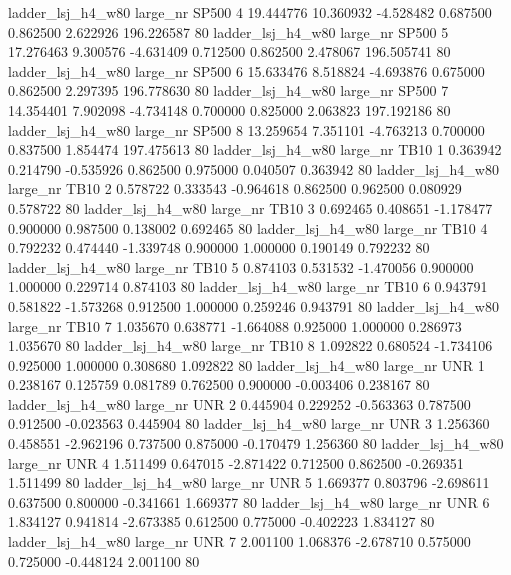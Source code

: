   ladder_lsj_h4_w80   large_nr    SP500                 4 19.444776 10.360932  -4.528482 0.687500 0.862500  2.622926  196.226587 80
  ladder_lsj_h4_w80   large_nr    SP500                 5 17.276463  9.300576  -4.631409 0.712500 0.862500  2.478067  196.505741 80
  ladder_lsj_h4_w80   large_nr    SP500                 6 15.633476  8.518824  -4.693876 0.675000 0.862500  2.297395  196.778630 80
  ladder_lsj_h4_w80   large_nr    SP500                 7 14.354401  7.902098  -4.734148 0.700000 0.825000  2.063823  197.192186 80
  ladder_lsj_h4_w80   large_nr    SP500                 8 13.259654  7.351101  -4.763213 0.700000 0.837500  1.854474  197.475613 80
  ladder_lsj_h4_w80   large_nr     TB10                 1  0.363942  0.214790  -0.535926 0.862500 0.975000  0.040507    0.363942 80
  ladder_lsj_h4_w80   large_nr     TB10                 2  0.578722  0.333543  -0.964618 0.862500 0.962500  0.080929    0.578722 80
  ladder_lsj_h4_w80   large_nr     TB10                 3  0.692465  0.408651  -1.178477 0.900000 0.987500  0.138002    0.692465 80
  ladder_lsj_h4_w80   large_nr     TB10                 4  0.792232  0.474440  -1.339748 0.900000 1.000000  0.190149    0.792232 80
  ladder_lsj_h4_w80   large_nr     TB10                 5  0.874103  0.531532  -1.470056 0.900000 1.000000  0.229714    0.874103 80
  ladder_lsj_h4_w80   large_nr     TB10                 6  0.943791  0.581822  -1.573268 0.912500 1.000000  0.259246    0.943791 80
  ladder_lsj_h4_w80   large_nr     TB10                 7  1.035670  0.638771  -1.664088 0.925000 1.000000  0.286973    1.035670 80
  ladder_lsj_h4_w80   large_nr     TB10                 8  1.092822  0.680524  -1.734106 0.925000 1.000000  0.308680    1.092822 80
  ladder_lsj_h4_w80   large_nr      UNR                 1  0.238167  0.125759   0.081789 0.762500 0.900000 -0.003406    0.238167 80
  ladder_lsj_h4_w80   large_nr      UNR                 2  0.445904  0.229252  -0.563363 0.787500 0.912500 -0.023563    0.445904 80
  ladder_lsj_h4_w80   large_nr      UNR                 3  1.256360  0.458551  -2.962196 0.737500 0.875000 -0.170479    1.256360 80
  ladder_lsj_h4_w80   large_nr      UNR                 4  1.511499  0.647015  -2.871422 0.712500 0.862500 -0.269351    1.511499 80
  ladder_lsj_h4_w80   large_nr      UNR                 5  1.669377  0.803796  -2.698611 0.637500 0.800000 -0.341661    1.669377 80
  ladder_lsj_h4_w80   large_nr      UNR                 6  1.834127  0.941814  -2.673385 0.612500 0.775000 -0.402223    1.834127 80
  ladder_lsj_h4_w80   large_nr      UNR                 7  2.001100  1.068376  -2.678710 0.575000 0.725000 -0.448124    2.001100 80
